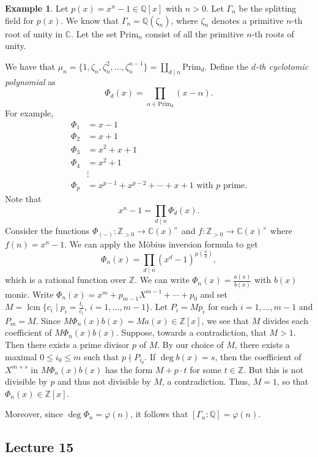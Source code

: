 \documentclass[10pt,letterpaper,cm]{nupset}
\theoremstyle{definition}
\newtheorem{exmp}{Example}
\newcommand{\C}{\mathbb C}
\newcommand{\Q}{\mathbb Q}
\newcommand{\Z}{\mathbb Z}
\newcommand{\1}{\mathbf{1}}
\newcommand{\0}{\vec 0}
\DeclareMathOperator{\lcm}{lcm}
\begin{document}
\begin{exmp}
Let $p(x)= x^n -1 \in \Q[x]$ with $n>0$. Let $\Gamma_n$ be the splitting field for $p(x)$. We know that $\Gamma_n = \Q(\zeta_n)$, where $\zeta_n$ denotes a primitive $n$-th root of unity in $\C$. Let the set $\text{Prim}_n$ consist of all the primitive $n$-th roots of unity. 

We have that $\mu_n = \{1, \zeta_n, \zeta_n^2, \ldots, \zeta_n^{n-1}\} =\coprod_{d\mid n} \text{Prim}_d$. Define the \textit{$d$-th cyclotomic polynomial} as $$\Phi_d(x) = \prod_{\alpha \in \text{Prim}_d}(x-\alpha).$$ 
For example,
\begin{align*}
\Phi_1 & = x-1
\\ \Phi_2 & = x+1
\\ \Phi_3 & = x^2 + x+1
\\ \Phi_4 & =  x^2+1
\\ & \vdots
\\ \Phi_p & = x^{p-1}+x^{p-2}+\cdots + x + 1 \text{ with } p \text{ prime.}
\end{align*}
Note that $$ x^n-1 =\prod_{d\mid n}\Phi_d(x)   .$$ Consider the functions $\Phi_{(-)}:\Z_{>0} \to \C(x)^{\times}$ and $f: \Z_{>0} \to \C(x)^{\times}$ where $f(n) = x^n-1$. We can apply the  M\"{o}bius inversion formula to get $$ \Phi_n(x) = \prod_{d\mid n}(x^d -1)^{\mu(\frac{n}{d})} ,$$ which is a rational function over $\Z$. We can write $\Phi_n(x) = \frac{a(x)}{b(x)}$ with $b(x)$ monic. Write $\Phi_n(x) = x^m + p_{m-1}X^{m-1} + \cdots + p_0$ and set $M = \lcm\{c_i \mid p_i = \frac{t_i}{c_i}, \ i=1, \ldots, m-1\}$. Let $P_i = Mp_i$ for each $i=1, \ldots, m-1$ and $P_m = M$. Since $ M\Phi_n(x)b(x) =Ma(x)\in \Z[x]$,  we see that $M$ divides each coefficient of $M\Phi_n(x)b(x)$. Suppose, towards a contradiction, that $M >1$. Then there exists a prime divisor $p$ of $M$. By our choice of $M$, there exists a maximal $0\leq i_0 \leq m$ such that $p \nmid P_{i_0}$. If $\deg{b(x)} =s$, then the coefficient of $X^{m+s}$ in $M\Phi_n(x)b(x)$ has the form $M + p \cdot t$ for some $t\in \Z$. But this is not divisible by $p$ and thus not divisible by $M$, a contradiction.   Thus, $M =1$, so that $\Phi_n(x) \in \Z[x]$. 

Moreover, since $\deg{\Phi_n}= \varphi(n)$, it follows that $[\Gamma_n : \Q] = \varphi(n)$.
\end{exmp}

\subsection{Lecture 15}
\end{document}
